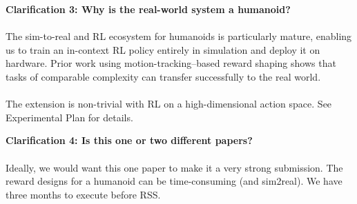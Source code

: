 \begin{tcolorbox}[clarifications]
\textbf{Clarification 3: Why is the real-world system a humanoid?}
\\\\
The sim-to-real and RL ecosystem for humanoids is particularly mature, enabling us to train an in-context RL policy entirely in simulation and deploy it on hardware. Prior work using motion-tracking--based reward shaping shows that tasks of comparable complexity can transfer successfully to the real world.
\\\\
The extension is non-trivial with RL on a high-dimensional action space. See Experimental Plan for details.
\end{tcolorbox}

\begin{tcolorbox}[clarifications]
\textbf{Clarification 4: Is this one or two different papers?}
\\\\
Ideally, we would want this one paper to make it a very strong submission. The reward designs for a humanoid can be time-consuming (and sim2real). We have three months to execute before RSS.
\end{tcolorbox}